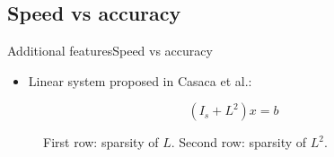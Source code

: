 \documentclass[10pt]{beamer}
\begin{document}
\subsection{Speed vs accuracy}
\begin{frame} {Additional features}{Speed vs accuracy}
  \begin{itemize}
	\item Linear system proposed in Casaca et al.:
\end{itemize}

  \begin{equation}
  (I_{s} + L^{2})x = b
  \end{equation}

\begin{figure}[H]
  \centering
  \qquad
  \qquad
  \end{figure}
\begin{figure}[H]
  \centering
  \qquad
  \qquad
    \caption{First row: sparsity of $L$. Second row: sparsity of $L^2$.}
  \end{figure}

\end{frame}
\end{document}
